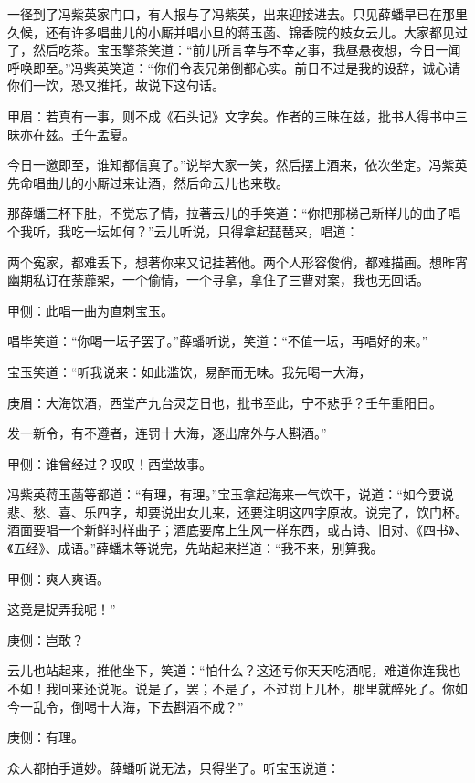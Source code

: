 \begin{parag}
    一径到了冯紫英家门口，有人报与了冯紫英，出来迎接进去。只见薛蟠早已在那里久候，还有许多唱曲儿的小厮并唱小旦的蒋玉菡、锦香院的妓女云儿。大家都见过了，然后吃茶。宝玉擎茶笑道：“前儿所言幸与不幸之事，我昼悬夜想，今日一闻呼唤即至。”冯紫英笑道：“你们令表兄弟倒都心实。前日不过是我的设辞，诚心请你们一饮，恐又推托，故说下这句话。\begin{note}甲眉：若真有一事，则不成《石头记》文字矣。作者的三昧在兹，批书人得书中三昧亦在兹。壬午孟夏。\end{note}今日一邀即至，谁知都信真了。”说毕大家一笑，然后摆上酒来，依次坐定。冯紫英先命唱曲儿的小厮过来让酒，然后命云儿也来敬。
\end{parag}


\begin{parag}
    那薛蟠三杯下肚，不觉忘了情，拉著云儿的手笑道：“你把那梯己新样儿的曲子唱个我听，我吃一坛如何？”云儿听说，只得拿起琵琶来，唱道：
\end{parag}


\begin{parag}
    两个寃家，都难丢下，想著你来又记挂著他。两个人形容俊俏，都难描画。想昨宵幽期私订在荼蘼架，一个偷情，一个寻拿，拿住了三曹对案，我也无回话。\begin{note}甲侧：此唱一曲为直刺宝玉。\end{note}
\end{parag}


\begin{parag}
    唱毕笑道：“你喝一坛子罢了。”薛蟠听说，笑道：“不值一坛，再唱好的来。”
\end{parag}


\begin{parag}
    宝玉笑道：“听我说来：如此滥饮，易醉而无味。我先喝一大海，\begin{note}庚眉：大海饮酒，西堂产九台灵芝日也，批书至此，宁不悲乎？壬午重阳日。\end{note}发一新令，有不遵者，连罚十大海，逐出席外与人斟酒。”\begin{note}甲侧：谁曾经过？叹叹！西堂故事。\end{note}冯紫英蒋玉菡等都道：“有理，有理。”宝玉拿起海来一气饮干，说道：“如今要说悲、愁、喜、乐四字，却要说出女儿来，还要注明这四字原故。说完了，饮门杯。酒面要唱一个新鲜时样曲子；酒底要席上生风一样东西，或古诗、旧对、《四书》、《五经》、成语。”薛蟠未等说完，先站起来拦道：“我不来，别算我。\begin{note}甲侧：爽人爽语。\end{note}这竟是捉弄我呢！”\begin{note}庚侧：岂敢？\end{note}云儿也站起来，推他坐下，笑道：“怕什么？这还亏你天天吃酒呢，难道你连我也不如！我回来还说呢。说是了，罢；不是了，不过罚上几杯，那里就醉死了。你如今一乱令，倒喝十大海，下去斟酒不成？”\begin{note}庚侧：有理。\end{note}众人都拍手道妙。薛蟠听说无法，只得坐了。听宝玉说道：
\end{parag}


